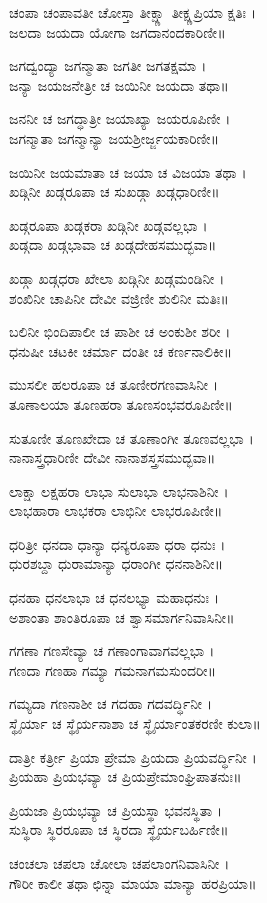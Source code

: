 ಚಂಪಾ ಚಂಪಾವತೀ ಚೋಸ್ತಾ ತೀಕ್ಷ್ಣಾ ತೀಕ್ಷ್ಣಪ್ರಿಯಾ ಕ್ಷತಿಃ ।\\
ಜಲದಾ ಜಯದಾ ಯೋಗಾ ಜಗದಾನಂದಕಾರಿಣೀ॥

ಜಗದ್ವಂದ್ಯಾ ಜಗನ್ಮಾತಾ ಜಗತೀ ಜಗತಕ್ಷಮಾ ।\\
ಜನ್ಯಾ ಜಯಜನೇತ್ರೀ ಚ ಜಯಿನೀ ಜಯದಾ ತಥಾ॥

ಜನನೀ ಚ ಜಗದ್ಧಾತ್ರೀ ಜಯಾಖ್ಯಾ ಜಯರೂಪಿಣೀ ।\\
ಜಗನ್ಮಾತಾ ಜಗನ್ಮಾನ್ಯಾ ಜಯಶ್ರೀರ್ಜ್ಜಯಕಾರಿಣೀ॥

ಜಯಿನೀ ಜಯಮಾತಾ ಚ ಜಯಾ ಚ ವಿಜಯಾ ತಥಾ ।\\
ಖಡ್ಗಿನೀ ಖಡ್ಗರೂಪಾ ಚ ಸುಖಡ್ಗಾ ಖಡ್ಗಧಾರಿಣೀ॥

ಖಡ್ಗರೂಪಾ ಖಡ್ಗಕರಾ ಖಡ್ಗಿನೀ ಖಡ್ಗವಲ್ಲಭಾ ।\\
ಖಡ್ಗದಾ ಖಡ್ಗಭಾವಾ ಚ ಖಡ್ಗದೇಹಸಮುದ್ಭವಾ॥

ಖಡ್ಗಾ ಖಡ್ಗಧರಾ ಖೇಲಾ ಖಡ್ಗಿನೀ ಖಡ್ಗಮಂಡಿನೀ ।\\
ಶಂಖಿನೀ ಚಾಪಿನೀ ದೇವೀ ವಜ್ರಿಣೀ ಶುಲಿನೀ ಮತಿಃ॥

ಬಲಿನೀ ಭಿಂದಿಪಾಲೀ ಚ ಪಾಶೀ ಚ ಅಂಕುಶೀ ಶರೀ ।\\
ಧನುಷೀ ಚಟಕೀ ಚರ್ಮಾ ದಂತೀ ಚ ಕರ್ಣನಾಲಿಕೀ॥

ಮುಸಲೀ ಹಲರೂಪಾ ಚ ತೂಣೀರಗಣವಾಸಿನೀ ।\\
ತೂಣಾಲಯಾ ತೂಣಹರಾ ತೂಣಸಂಭವರೂಪಿಣೀ॥

ಸುತೂಣೀ ತೂಣಖೇದಾ ಚ ತೂಣಾಂಗೀ ತೂಣವಲ್ಲಭಾ ।\\
ನಾನಾಸ್ತ್ರಧಾರಿಣೀ ದೇವೀ ನಾನಾಶಸ್ತ್ರಸಮುದ್ಭವಾ॥

ಲಾಕ್ಷಾ ಲಕ್ಷಹರಾ ಲಾಭಾ ಸುಲಾಭಾ ಲಾಭನಾಶಿನೀ ।\\
ಲಾಭಹಾರಾ ಲಾಭಕರಾ ಲಾಭಿನೀ ಲಾಭರೂಪಿಣೀ॥

ಧರಿತ್ರೀ ಧನದಾ ಧಾನ್ಯಾ ಧನ್ಯರೂಪಾ ಧರಾ ಧನುಃ ।\\
ಧುರಶಬ್ದಾ ಧುರಾಮಾನ್ಯಾ ಧರಾಂಗೀ ಧನನಾಶಿನೀ॥

ಧನಹಾ ಧನಲಾಭಾ ಚ ಧನಲಭ್ಯಾ ಮಹಾಧನುಃ ।\\
ಅಶಾಂತಾ ಶಾಂತಿರೂಪಾ ಚ ಶ್ವಾಸಮಾರ್ಗನಿವಾಸಿನೀ॥

ಗಗಣಾ ಗಣಸೇವ್ಯಾ ಚ ಗಣಾಂಗಾವಾಗವಲ್ಲಭಾ ।\\
ಗಣದಾ ಗಣಹಾ ಗಮ್ಯಾ ಗಮನಾಗಮಸುಂದರೀ॥

ಗಮ್ಯದಾ ಗಣನಾಶೀ ಚ ಗದಹಾ ಗದವರ್ದ್ಧಿನೀ ।\\
ಸ್ಥೈರ್ಯಾ ಚ ಸ್ಥೈರ್ಯನಾಶಾ ಚ ಸ್ಥೈರ್ಯಾಂತಕರಣೀ ಕುಲಾ॥

ದಾತ್ರೀ ಕರ್ತ್ರೀ ಪ್ರಿಯಾ ಪ್ರೇಮಾ ಪ್ರಿಯದಾ ಪ್ರಿಯವರ್ದ್ಧಿನೀ ।\\
ಪ್ರಿಯಹಾ ಪ್ರಿಯಭವ್ಯಾ ಚ ಪ್ರಿಯಪ್ರೇಮಾಂಘ್ರಿಪಾತನುಃ॥

ಪ್ರಿಯಜಾ ಪ್ರಿಯಭವ್ಯಾ ಚ ಪ್ರಿಯಸ್ಥಾ ಭವನಸ್ಥಿತಾ ।\\
ಸುಸ್ಥಿರಾ ಸ್ಥಿರರೂಪಾ ಚ ಸ್ಥಿರದಾ ಸ್ಥೈರ್ಯಬರ್ಹಿಣೀ॥

ಚಂಚಲಾ ಚಪಲಾ ಚೋಲಾ ಚಪಲಾಂಗನಿವಾಸಿನೀ ।\\
ಗೌರೀ ಕಾಲೀ ತಥಾ ಛಿನ್ನಾ ಮಾಯಾ ಮಾನ್ಯಾ ಹರಪ್ರಿಯಾ॥

